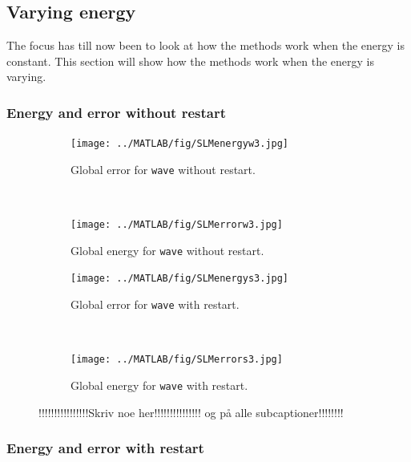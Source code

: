 \subsection{Varying energy}
The focus has till now been to look at how the methods work when the energy is constant. This section will show how the methods work when the energy is varying. 

\subsubsection{Energy and error without restart}%

\begin{figure}[H]
        \centering
        \begin{subfigure}[b]{0.45\textwidth}
                \texttt{[image: ../MATLAB/fig/SLMenergyw3.jpg]}
                \caption{Global error for \texttt{wave} without restart.}
                \label{fig:SLMenergyw1}
        \end{subfigure}
        ~
        \begin{subfigure}[b]{0.45\textwidth}
                \texttt{[image: ../MATLAB/fig/SLMerrorw3.jpg]}
                \caption{Global energy for \texttt{wave} without restart.}
                \label{fig:SLMerrorw1}
        \end{subfigure}
        
        \begin{subfigure}[b]{0.45\textwidth}
                \texttt{[image: ../MATLAB/fig/SLMenergys3.jpg]}
                \caption{Global error for \texttt{wave} with restart.}
                \label{fig:SLMenergys1}
        \end{subfigure}
		~
        \begin{subfigure}[b]{0.45\textwidth}
                \texttt{[image: ../MATLAB/fig/SLMerrors3.jpg]}
                \caption{Global energy for \texttt{wave} with restart.}
                \label{fig:SLMerrors1}
        \end{subfigure}
        \caption{!!!!!!!!!!!!!!!!Skriv noe her!!!!!!!!!!!!!!! og på alle subcaptioner!!!!!!!!}
        \label{fig:SLMenergyerror1}
\end{figure}
\subsubsection{Energy and error with restart}%

